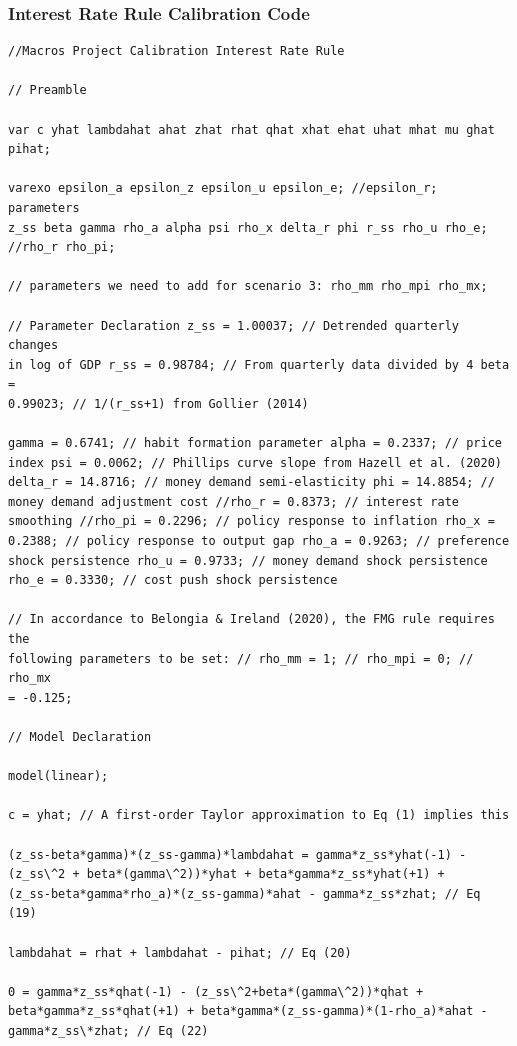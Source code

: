 \documentclass[11pt,preprint, authoryear]{elsarticle}
\numberwithin{equation}{section}
\numberwithin{figure}{section}
\numberwithin{table}{section}
\begin{document}
\hypertarget{interest-rate-rule-calibration-code}{%
\subsubsection{Interest Rate Rule Calibration
Code}\label{interest-rate-rule-calibration-code}}

\begin{verbatim}
//Macros Project Calibration Interest Rate Rule

// Preamble

var c yhat lambdahat ahat zhat rhat qhat xhat ehat uhat mhat mu ghat
pihat;

varexo epsilon_a epsilon_z epsilon_u epsilon_e; //epsilon_r; parameters
z_ss beta gamma rho_a alpha psi rho_x delta_r phi r_ss rho_u rho_e;
//rho_r rho_pi;

// parameters we need to add for scenario 3: rho_mm rho_mpi rho_mx;

// Parameter Declaration z_ss = 1.00037; // Detrended quarterly changes
in log of GDP r_ss = 0.98784; // From quarterly data divided by 4 beta =
0.99023; // 1/(r_ss+1) from Gollier (2014)

gamma = 0.6741; // habit formation parameter alpha = 0.2337; // price
index psi = 0.0062; // Phillips curve slope from Hazell et al. (2020)
delta_r = 14.8716; // money demand semi-elasticity phi = 14.8854; //
money demand adjustment cost //rho_r = 0.8373; // interest rate
smoothing //rho_pi = 0.2296; // policy response to inflation rho_x =
0.2388; // policy response to output gap rho_a = 0.9263; // preference
shock persistence rho_u = 0.9733; // money demand shock persistence
rho_e = 0.3330; // cost push shock persistence

// In accordance to Belongia & Ireland (2020), the FMG rule requires the
following parameters to be set: // rho_mm = 1; // rho_mpi = 0; // rho_mx
= -0.125;

// Model Declaration

model(linear);

c = yhat; // A first-order Taylor approximation to Eq (1) implies this

(z_ss-beta*gamma)*(z_ss-gamma)*lambdahat = gamma*z_ss*yhat(-1) -
(z_ss\^2 + beta*(gamma\^2))*yhat + beta*gamma*z_ss*yhat(+1) +
(z_ss-beta*gamma*rho_a)*(z_ss-gamma)*ahat - gamma*z_ss*zhat; // Eq (19)

lambdahat = rhat + lambdahat - pihat; // Eq (20)

0 = gamma*z_ss*qhat(-1) - (z_ss\^2+beta*(gamma\^2))*qhat +
beta*gamma*z_ss*qhat(+1) + beta*gamma*(z_ss-gamma)*(1-rho_a)*ahat -
gamma*z_ss\*zhat; // Eq (22)


\end{verbatim}
\end{document}
